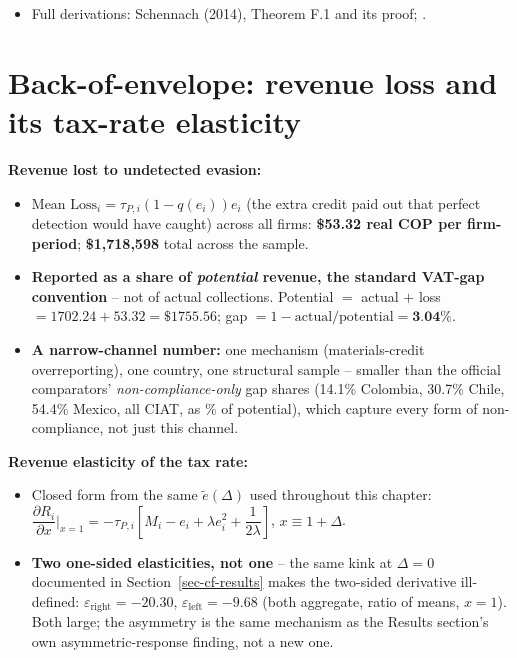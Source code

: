 \documentclass[
  12pt,
  letterpaper,
  oneside,
  openany]{report}
\providecommand{\tightlist}{%
  \setlength{\itemsep}{0pt}\setlength{\parskip}{0pt}}
\begin{document}
\begin{itemize}
\tightlist
\item
  Full derivations: Schennach (2014), Theorem F.1 and its proof; .
\end{itemize}

\section{Back-of-envelope: revenue loss and its tax-rate
elasticity}\label{sec-app-backofenvelope}

\textbf{Revenue lost to undetected evasion:}

\begin{itemize}
\tightlist
\item
  Mean \(\text{Loss}_i=\tau_{P,i}(1-q(e_i))e_i\) (the extra credit paid
  out that perfect detection would have caught) across all firms:
  \textbf{\$53.32 real COP per firm-period}; \textbf{\$1,718,598} total
  across the sample.
\item
  \textbf{Reported as a share of \emph{potential} revenue, the standard
  VAT-gap convention} -- not of actual collections. Potential \(=\)
  actual \(+\) loss \(=1702.24+53.32=\$1755.56\); gap
  \(=1-\text{actual/potential}=\textbf{3.04\%}\).
\item
  \textbf{A narrow-channel number:} one mechanism (materials-credit
  overreporting), one country, one structural sample -- smaller than the
  official comparators' \emph{non-compliance-only} gap shares (14.1\%
  Colombia, 30.7\% Chile, 54.4\% Mexico, all CIAT, as \% of potential),
  which capture every form of non-compliance, not just this channel.
\end{itemize}

\textbf{Revenue elasticity of the tax rate:}

\begin{itemize}
\tightlist
\item
  Closed form from the same \(\tilde e(\Delta)\) used throughout this
  chapter:
  \(\dfrac{\partial R_i}{\partial x}\Big|_{x=1}=-\tau_{P,i}\left[M_i-e_i+\lambda e_i^2+\dfrac{1}{2\lambda}\right]\),
  \(x\equiv1+\Delta\).
\item
  \textbf{Two one-sided elasticities, not one} -- the same kink at
  \(\Delta=0\) documented in Section~\ref{sec-cf-results} makes the
  two-sided derivative ill-defined:
  \(\varepsilon_{\text{right}}=-20.30\),
  \(\varepsilon_{\text{left}}=-9.68\) (both aggregate, ratio of means,
  \(x=1\)). Both large; the asymmetry is the same mechanism as the
  Results section's own asymmetric-response finding, not a new one.
\end{itemize}
\end{document}
